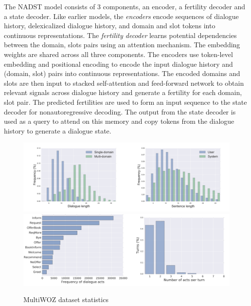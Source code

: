 \documentclass[12pt,a4paper]{article}
\begin{document}
The NADST model consists of 3 components, an encoder, a fertility decoder and a state decoder. Like earlier models, the \textit{encoders} encode sequences of dialogue history, delexicalized dialogue
history, and domain and slot tokens into continuous representations. The \textit{fertility decoder} learns potential dependencies between the domain, slots pairs using an attention mechanism. The embedding weights are shared across all three components. The encoders use token-level embedding and positional encoding to encode the input dialogue history and (domain, slot) pairs into continuous representations. The encoded domains and slots are then input to stacked self-attention and feed-forward network to obtain relevant signals across dialogue history and generate a fertility for each domain, slot pair. The predicted fertilities are used to form an input sequence to the state decoder for nonautoregressive decoding. The output from the state decoder is used as a query to attend on this memory and copy tokens from the dialogue history to generate a dialogue state.

\begin{figure}[!ht]
  \centering
  \caption{MultiWOZ dataset statistics}
  \includegraphics[width=\textwidth]{./images/multiwoz-stats.png}
  \includegraphics[width=\textwidth]{./images/acts.png}
\end{figure}
\end{document}
